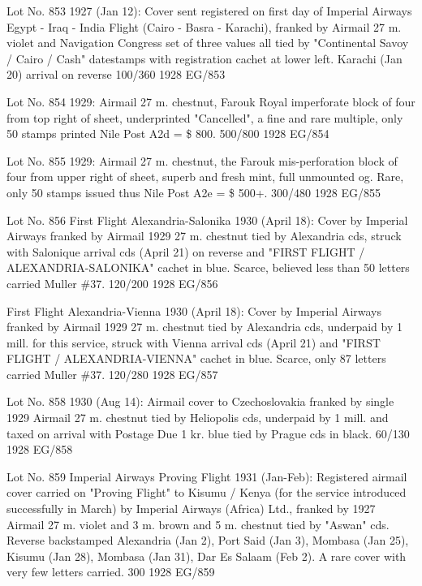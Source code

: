 \documentclass[justified]{tufte-book}
\begin{document}
%
{Lot No. 853
1927 (Jan 12): Cover sent registered on first day of Imperial Airways Egypt - Iraq - India Flight (Cairo - Basra - Karachi), franked by Airmail 27 m. violet and Navigation Congress set of three values all tied by "Continental Savoy / Cairo / Cash" datestamps with registration cachet at lower left. Karachi (Jan 20) arrival on reverse 100/360}%
{1928}%
{EG/853}%
{}%
{}
{}%
{}


%
{Lot No. 854
1929: Airmail 27 m. chestnut, Farouk Royal imperforate block of four from top right of sheet, underprinted "Cancelled", a fine and rare multiple, only 50 stamps printed Nile Post A2d = \$ 800.  500/800}%
{1928}%
{EG/854}%
{}%
{}
{}%
{}


%
{Lot No. 855
1929: Airmail 27 m. chestnut, the Farouk mis-perforation block of four from upper right of sheet, superb and fresh mint, full unmounted og. Rare, only 50 stamps issued thus Nile Post A2e = \$ 500+. 300/480}%
{1928}%
{EG/855}%
{}%
{}
{}%
{}


%
{Lot No. 856
First Flight Alexandria-Salonika 1930 (April 18): Cover by Imperial Airways franked by Airmail 1929 27 m. chestnut tied by Alexandria cds, struck with Salonique arrival cds (April 21) on reverse and "FIRST FLIGHT / ALEXANDRIA-SALONIKA" cachet in blue. Scarce, believed less than 50 letters carried Muller \#37. 120/200}%
{1928}%
{EG/856}%
{}%
{}
{}%
{}

%
{First Flight Alexandria-Vienna 1930 (April 18): Cover by Imperial Airways franked by Airmail 1929 27 m. chestnut tied by Alexandria cds, underpaid by 1 mill. for this service, struck with Vienna arrival cds (April 21) and "FIRST FLIGHT / ALEXANDRIA-VIENNA" cachet in blue. Scarce, only 87 letters carried Muller \#37. 120/280}%
{1928}%
{EG/857}%
{}%
{}
{}%
{}

%
{Lot No. 858
1930 (Aug 14): Airmail cover to Czechoslovakia franked by single 1929 Airmail 27 m. chestnut tied by Heliopolis cds, underpaid by 1 mill. and taxed on arrival with Postage Due 1 kr. blue tied by Prague cds in black. 60/130}%
{1928}%
{EG/858}%
{}%
{}
{}%
{}

%
{Lot No. 859
Imperial Airways Proving Flight 1931 (Jan-Feb): Registered airmail cover carried on "Proving Flight" to Kisumu / Kenya (for the service introduced successfully in March) by Imperial Airways (Africa) Ltd., franked by 1927 Airmail 27 m. violet and 3 m. brown and 5 m. chestnut tied by "Aswan" cds.  Reverse backstamped Alexandria (Jan 2), Port Said (Jan 3), Mombasa (Jan 25), Kisumu (Jan 28), Mombasa (Jan 31), Dar Es Salaam (Feb 2). A rare cover with very few letters carried. 300}%
{1928}%
{EG/859}%
{}%
{}
{}%
{}
\end{document}
